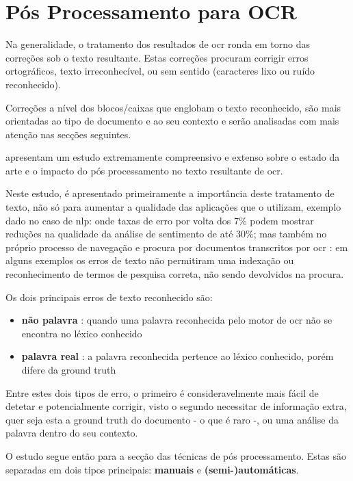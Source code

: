 \section{Pós Processamento para OCR}
\label{sec_pos_proc_ocr}

Na generalidade, o tratamento dos resultados de \acrshort{ocr} ronda em torno das correções sob o texto resultante. Estas correções procuram corrigir erros ortográficos, texto irreconhecível, ou sem sentido (caracteres lixo ou ruído reconhecido).

Correções a nível dos blocos/caixas que englobam o texto reconhecido, são mais orientadas ao tipo de documento e ao seu contexto e serão analisadas com mais atenção nas secções seguintes.

\cite{10.1145/3453476} apresentam um estudo extremamente compreensivo e extenso sobre o estado da arte e o impacto do pós processamento no texto resultante de \acrshort{ocr}.

Neste estudo, é apresentado primeiramente a importância deste tratamento de texto, não só para aumentar a qualidade das aplicações que o utilizam, exemplo dado no caso de \acrshort{nlp}: onde taxas de erro por volta dos 7\% podem mostrar reduções na qualidade da análise de sentimento de até 30\%; mas também no próprio processo de navegação e procura por documentos transcritos por \acrshort{ocr} : em alguns exemplos os erros de texto não permitiram uma indexação ou reconhecimento de termos de pesquisa correta, não sendo devolvidos na procura.

Os dois principais erros de texto reconhecido são:
\begin{itemize}
    \item \textbf{não palavra} : quando uma palavra reconhecida pelo motor de \acrshort{ocr} não se encontra no léxico conhecido
    \item \textbf{palavra real} : a palavra reconhecida pertence ao léxico conhecido, porém difere da \gls{ground truth}
\end{itemize}
Entre estes dois tipos de erro, o primeiro é consideravelmente mais fácil de detetar e potencialmente corrigir, visto o segundo necessitar de informação extra, quer seja esta a \gls{ground truth} do documento - o que é raro -, ou uma análise da palavra dentro do seu contexto.

O estudo segue então para a secção das técnicas de pós processamento. Estas são separadas em dois tipos principais: \textbf{manuais} e \textbf{(semi-)automáticas}.

